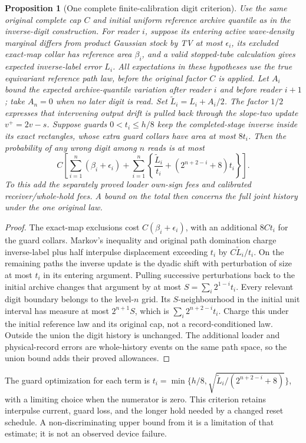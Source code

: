 \documentclass[11pt]{article}
\numberwithin{equation}{section}
\newtheorem{proposition}[theorem]{Proposition}
\theoremstyle{definition}
\theoremstyle{remark}
\begin{document}
\begin{proposition}[One complete finite-calibration digit criterion]
\label{p2s:prop:digits}
Use the same original complete cap $C$ and initial uniform reference archive
quantile as in the inverse-digit construction. For reader $i$, suppose its
entering active wave-density marginal differs from product Gaussian stock
by TV at most $\epsilon_i$, its excluded exact-map collar has reference
area $\beta_i$, and a valid stopped-tube calculation gives expected
inverse-label error $L_i$. All expectations in these hypotheses use the
true equivariant reference path law, before the original factor $C$ is
applied. Let $A_i$ bound the expected archive-quantile variation after
reader $i$ and before reader $i+1$; take $A_n=0$ when no later digit is
read. Set $\widetilde L_i=L_i+A_i/2$. The factor $1/2$ expresses that
intervening output drift is pulled back through the slope-two update
$v^+=2v-s$. Suppose guards $0<t_i\leq h/8$ keep the
completed-stage inverse inside its exact rectangles, whose extra guard
collars have area at most $8t_i$. Then the probability of any wrong digit
among $n$ reads is at most
\begin{equation}\label{p2s:eq:digits}
 C\left[\sum_{i=1}^n(\beta_i+\epsilon_i)
 +\sum_{i=1}^n\left\{
       \frac{\widetilde L_i}{t_i}
       +(2^{n+2-i}+8)t_i\right\}\right].
\end{equation}
To this add the separately proved loader own-sign fees and calibrated
receiver/whole-hold fees. A bound on the total then concerns the full joint
history under the one original law.
\end{proposition}
\begin{proof}
The exact-map exclusions cost $C(\beta_i+\epsilon_i)$, with an additional
$8Ct_i$ for the guard collars. Markov's inequality and original path
domination charge inverse-label plus half interpulse displacement exceeding
$t_i$ by $C\widetilde L_i/t_i$. On the remaining paths the inverse update is
the dyadic shift with perturbation of size at most $t_i$ in its entering
argument. Pulling successive perturbations back to the initial archive
changes that argument by at most $S=\sum_i2^{1-i}t_i$. Every relevant digit
boundary belongs to the level-$n$ grid. Its $S$-neighbourhood in the initial
unit interval has measure at most $2^{n+1}S$, which is
$\sum_i2^{n+2-i}t_i$. Charge this under the initial reference law and its
original cap, not a record-conditioned law. Outside the union the digit
history is unchanged. The additional loader and physical-record errors
are whole-history events on the same path space, so the union bound adds
their proved allowances.
\end{proof}
The guard optimization for each term is
$t_i=\min\{h/8,\sqrt{\widetilde L_i/(2^{n+2-i}+8)}\}$, with a limiting
choice when the numerator is zero. This criterion retains interpulse
current, guard loss, and the longer hold needed by a changed reset schedule.
A non-discriminating upper bound from it is a limitation of that estimate;
it is not an observed device failure.
\end{document}
